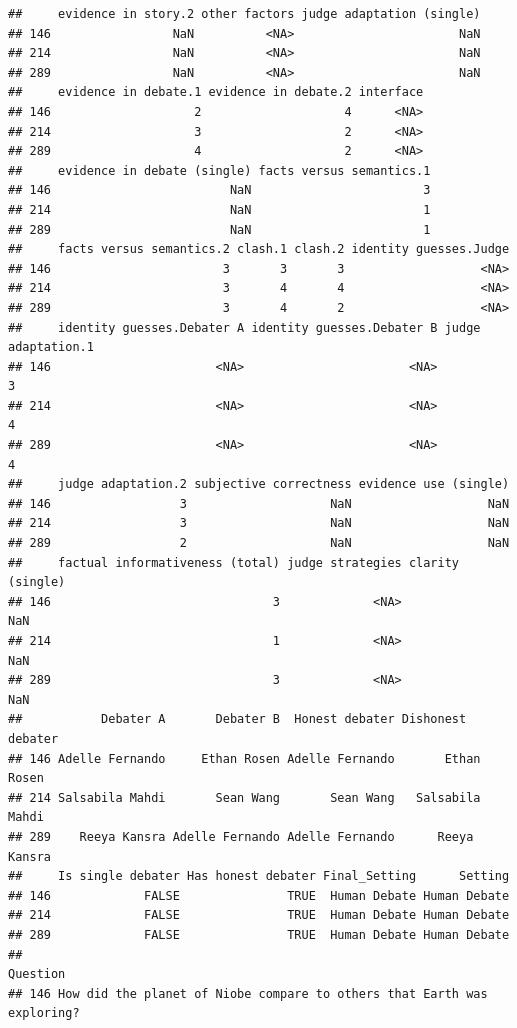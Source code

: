 \documentclass[
]{article}
\begin{document}
\begin{verbatim}
##     evidence in story.2 other factors judge adaptation (single)
## 146                 NaN          <NA>                       NaN
## 214                 NaN          <NA>                       NaN
## 289                 NaN          <NA>                       NaN
##     evidence in debate.1 evidence in debate.2 interface
## 146                    2                    4      <NA>
## 214                    3                    2      <NA>
## 289                    4                    2      <NA>
##     evidence in debate (single) facts versus semantics.1
## 146                         NaN                        3
## 214                         NaN                        1
## 289                         NaN                        1
##     facts versus semantics.2 clash.1 clash.2 identity guesses.Judge
## 146                        3       3       3                   <NA>
## 214                        3       4       4                   <NA>
## 289                        3       4       2                   <NA>
##     identity guesses.Debater A identity guesses.Debater B judge adaptation.1
## 146                       <NA>                       <NA>                  3
## 214                       <NA>                       <NA>                  4
## 289                       <NA>                       <NA>                  4
##     judge adaptation.2 subjective correctness evidence use (single)
## 146                  3                    NaN                   NaN
## 214                  3                    NaN                   NaN
## 289                  2                    NaN                   NaN
##     factual informativeness (total) judge strategies clarity (single)
## 146                               3             <NA>              NaN
## 214                               1             <NA>              NaN
## 289                               3             <NA>              NaN
##           Debater A       Debater B  Honest debater Dishonest debater
## 146 Adelle Fernando     Ethan Rosen Adelle Fernando       Ethan Rosen
## 214 Salsabila Mahdi       Sean Wang       Sean Wang   Salsabila Mahdi
## 289    Reeya Kansra Adelle Fernando Adelle Fernando      Reeya Kansra
##     Is single debater Has honest debater Final_Setting      Setting
## 146             FALSE               TRUE  Human Debate Human Debate
## 214             FALSE               TRUE  Human Debate Human Debate
## 289             FALSE               TRUE  Human Debate Human Debate
##                                                                    Question
## 146 How did the planet of Niobe compare to others that Earth was exploring?

\end{verbatim}
\end{document}
